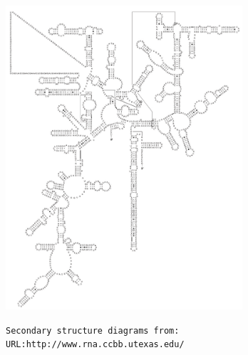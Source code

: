 \documentclass[landscape]{slides}
\begin{document}
\begin{slide}
\begin{center}
\includegraphics[height=4.45in]{figs/zmays_16S_man}
\end{center}

\begin{flushright}
\tiny{\texttt{Secondary structure diagrams from:}} \\
\tiny{\texttt{URL:http://www.rna.ccbb.utexas.edu/}}
\end{flushright}
\vfill
\end{slide}
\end{document}
